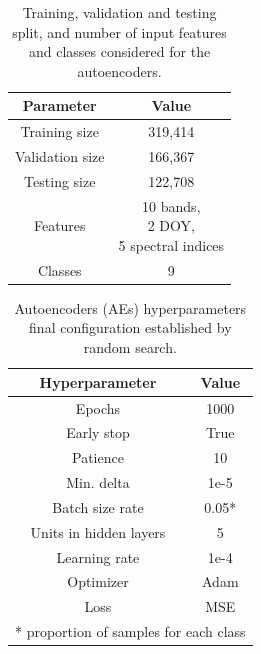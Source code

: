 \documentclass[journal,article,submit,pdftex,moreauthors]{Definitions/mdpi}
\begin{document}
\begin{minipage}[t]{0.45\textwidth}
	\begin{table}[H]
        \centering
        \footnotesize
		\caption{Training, validation and testing split, and number of input features and classes considered for the autoencoders.}
		\begin{tabular}{c|c} 
			\hline
			Parameter & Value \\ [1ex] 
			\hline
			Training size & 319,414 \\ [1ex]
			Validation size & 166,367 \\[1ex]
			Testing size & 122,708 \\ [1ex]
			Features & \makecell{10 bands, \\ 2 DOY,\\ 5 spectral indices} \\ [1ex] 
			Classes & 9 \\ [1ex] 
			\hline
		\end{tabular}
	\label{data_split}
	\end{table}
\end{minipage}\hspace{0.5cm}
\begin{minipage}[t]{0.45\textwidth}
	\begin{table}[H]
        \centering
        \footnotesize
		\caption{Autoencoders (AEs) hyperparameters final configuration established by random search.}
		\begin{tabular}{c|c}
		\hline
			Hyperparameter & Value \\ \hline
			Epochs & 1000 \\
			Early stop & True \\ 
			Patience & 10 \\ 
			Min. delta & 1e-5 \\ 
			Batch size rate & 0.05* \\ 
			Units in hidden layers & 5 \\ 
			Learning rate & 1e-4 \\ 
			Optimizer & Adam \\ 
			Loss & MSE \\ \hline
			\multicolumn{2}{c}{* proportion of samples for each class}
		\end{tabular}
		\label{hyperparameters_aes}
	\end{table}
\end{minipage}\vspace{0.5cm}

\end{document}
